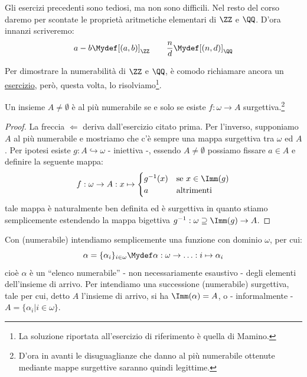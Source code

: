\begin{note}
	Gli esercizi precedenti sono tediosi, ma non sono difficili. Nel resto del corso daremo per scontate le proprietà aritmetiche elementari di $\ZZ$ e $\QQ$.
	D'ora innanzi scriveremo:
	\[ a - b \Mydef [(a,b)]_{\ZZ} \qquad \frac{n}{d} \Mydef [(n,d)]_\QQ
		\]
\end{note}

Per dimostrare la numerabilità di $\ZZ$ e $\QQ$, è comodo richiamare ancora un \hyperref[disuguaglianze_senza_AC2]{esercizio}, però, questa volta, lo risolviamo\footnote{La soluzione riportata all'esercizio di riferimento è quella di Mamino.}.

\begin{corollary}
	\label{disugcardnum}
	Un insieme $A \ne \emptyset$ è al più numerabile se e solo se esiste $f : \omega \rightarrow A$ surgettiva.\footnote{D'ora in avanti le disuguaglianze che danno al più numerabile ottenute mediante mappe surgettive saranno quindi legittime.}
\end{corollary}

\begin{proof}
	La freccia $\Longleftarrow$ deriva dall'esercizio citato prima. Per l'inverso, supponiamo $A$ al più numerabile e mostriamo che c'è sempre una mappa surgettiva tra $\omega$ ed $A$.
	Per ipotesi esiste $g : A \hookrightarrow \omega$ - iniettiva -, essendo $A \ne \emptyset$ possiamo fissare $a \in A$ e definire la seguente mappa:
	\[ f : \omega \to A : x \mapsto \begin{cases}
										g^{-1}(x) &\text{se $x \in \Imm(g)$} \\
										a &\text{altrimenti}
									\end{cases}
		\]
	tale mappa è naturalmente ben definita ed è surgettiva in quanto stiamo semplicemente estendendo la mappa bigettiva $g^{-1} : \omega\supseteq\Imm(g) \to A$.
\end{proof}

\begin{notation}
	Con  (numerabile) intendiamo semplicemente una funzione con dominio $\omega$, per cui:
	\[ \alpha = \{\alpha_i\}_{i \in \omega} \Mydef \alpha : \omega \to \ldots: i \mapsto \alpha_i
		\]
	cioè $\alpha$ è un ``elenco numerabile'' - non necessariamente esaustivo - degli elementi dell'insieme di arrivo. Per 
	intendiamo una successione (numerabile) surgettiva, tale per cui, detto $A$ l'insieme di arrivo, si ha $\Imm(\alpha) = A$, o - informalmente - $A = \{\alpha_i | i \in \omega\}$.
\end{notation}


